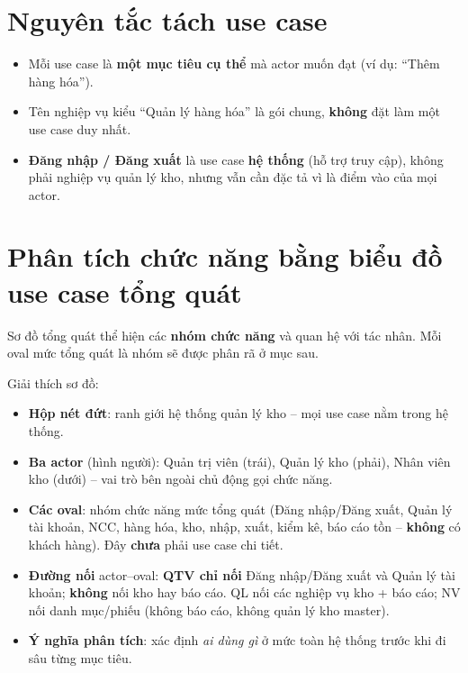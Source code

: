 \section{Nguyên tắc tách use case}

\begin{itemize}[leftmargin=1.5cm]
    \item Mỗi use case là \textbf{một mục tiêu cụ thể} mà actor muốn đạt (ví dụ: ``Thêm hàng hóa'').
    \item Tên nghiệp vụ kiểu ``Quản lý hàng hóa'' là gói chung, \textbf{không} đặt làm một use case duy nhất.
    \item \textbf{Đăng nhập / Đăng xuất} là use case \textbf{hệ thống} (hỗ trợ truy cập), không phải nghiệp vụ quản lý kho, nhưng vẫn cần đặc tả vì là điểm vào của mọi actor.
\end{itemize}

\section{Phân tích chức năng bằng biểu đồ use case tổng quát}

Sơ đồ tổng quát thể hiện các \textbf{nhóm chức năng} và quan hệ với tác nhân. Mỗi oval mức tổng quát là nhóm sẽ được phân rã ở mục sau.



Giải thích sơ đồ:
\begin{itemize}[leftmargin=1.5cm]
    \item \textbf{Hộp nét đứt}: ranh giới hệ thống quản lý kho -- mọi use case nằm trong hệ thống.
    \item \textbf{Ba actor} (hình người): Quản trị viên (trái), Quản lý kho (phải), Nhân viên kho (dưới) -- vai trò bên ngoài chủ động gọi chức năng.
    \item \textbf{Các oval}: nhóm chức năng mức tổng quát (Đăng nhập/Đăng xuất, Quản lý tài khoản, NCC, hàng hóa, kho, nhập, xuất, kiểm kê, báo cáo tồn -- \textbf{không} có khách hàng). Đây \textbf{chưa} phải use case chi tiết.
    \item \textbf{Đường nối} actor--oval: \textbf{QTV chỉ nối} Đăng nhập/Đăng xuất và Quản lý tài khoản; \textbf{không} nối kho hay báo cáo. QL nối các nghiệp vụ kho + báo cáo; NV nối danh mục/phiếu (không báo cáo, không quản lý kho master).
    \item \textbf{Ý nghĩa phân tích}: xác định \textit{ai dùng gì} ở mức toàn hệ thống trước khi đi sâu từng mục tiêu.
\end{itemize}

